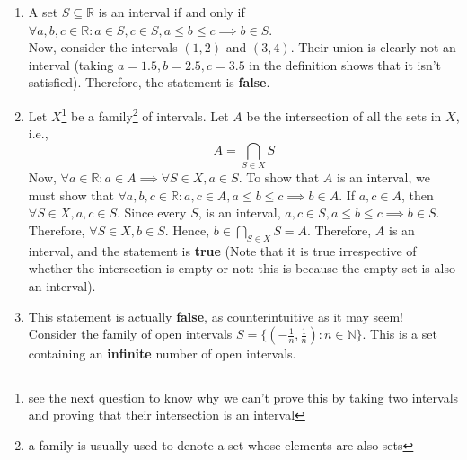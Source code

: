 \documentclass{article}
\begin{document}
\begin{enumerate}
	\item A set $S \subseteq \mathbb{R}$ is an interval if and only if $\forall a, b, c \in \mathbb{R}: a \in S, c \in S, a \leq b \leq c \implies b \in S$.
	\\Now, consider the intervals $(1, 2)$ and $(3, 4)$. Their union is clearly not an interval (taking $a = 1.5, b = 2.5, c = 3.5$ in the definition shows that it isn't satisfied). Therefore, the statement is \textbf{false}.
	\item Let $X$\footnote[1]{see the next question to know why we can't prove this by taking two intervals and proving that their intersection is an interval} be a family\footnote[2]{a family is usually used to denote a set whose elements are also sets} of intervals. Let $A$ be the intersection of all the sets in $X$, i.e.,
	\begin{equation*}
		A = \bigcap_{S \in X} S
	\end{equation*}
	Now, $\forall a \in \mathbb{R}: a \in A \implies \forall S \in X, a \in S$. To show that $A$ is an interval, we must show that $\forall a, b, c \in \mathbb{R}: a, c \in A, a \leq b \leq c \implies b \in A$.
	If $a, c \in A$, then $\forall S \in X, a, c \in S$. Since every $S$, is an interval, $a, c \in S, a \leq b \leq c \implies b \in S$. Therefore, $\forall S \in X, b \in S$.
	Hence, $b \in \bigcap_{S \in X} S = A$. Therefore, $A$ is an interval, and the statement is \textbf{true} (Note that it is true irrespective of whether the intersection is empty or not: this is because the empty set is also an interval).
	\item This statement is actually \textbf{false}, as counterintuitive as it may seem!\\
	Consider the family of open intervals $S = \{\left( -\frac{1}{n}, \frac{1}{n} \right) : n \in \mathbb{N}\}$. This is a set containing an \textbf{infinite} number of open intervals.

\end{enumerate}
\end{document}
